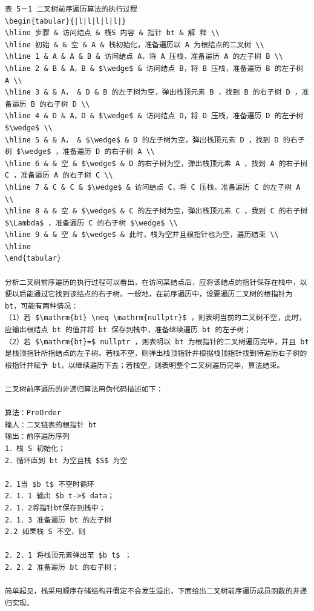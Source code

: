 \documentclass[10pt]{article}
\begin{document}
\begin{verbatim}
表 5－1 二叉树前序遍历算法的执行过程
\begin{tabular}{|l|l|l|l|l|}
\hline 步骤 & 访问结点 & 桟S 内容 & 指针 bt & 解 释 \\
\hline 初始 & & 空 & A & 栈初始化，准备遍历以 A 为根结点的二叉树 \\
\hline 1 & A & A & B & 访问结点 A，将 A 压栈，准备遍历 A 的左子树 B \\
\hline 2 & B & A，B & $\wedge$ & 访问结点 B，将 B 压栈，准备遍历 B 的左子树 A \\
\hline 3 & & A， & D & B 的左子树为空，弹出栈顶元素 B ，找到 B 的右子树 D ，准备遍历 B 的右子树 D \\
\hline 4 & D & A，D & $\wedge$ & 访问结点 D，将 D 压桟，准备遍历 D 的左子树 $\wedge$ \\
\hline 5 & & A， & $\wedge$ & D 的左子树为空，弹出栈顶元素 D ，找到 D 的右子树 $\wedge$ ，准备遍历 D 的右子树 A \\
\hline 6 & & 空 & $\wedge$ & D 的右子树为空，弹出栈顶元素 A ，找到 A 的右子树 C ，准备遍历 A 的右子树 C \\
\hline 7 & C & C & $\wedge$ & 访问结点 C，将 C 压栈，准备遍历 C 的左子树 A \\
\hline 8 & & 空 & $\wedge$ & C 的左子树为空，弹出栈顶元素 C ，我到 C 的右子树 $\Lambda$ ，准备遍历 C 的右子树 $\wedge$ \\
\hline 9 & & 空 & $\wedge$ & 此时，栈为空并且根指针也为空，遍历结束 \\
\hline
\end{tabular}

分析二叉树前序遍历的执行过程可以看出，在访问某结点后，应将该结点的指针保存在栈中，以便以后能通过它找到该结点的右子树。一般地，在前序遍历中，设要遍历二叉树的根指针为 bt，可能有两种情况：
（1）若 $\mathrm{bt} \neq \mathrm{nullptr}$ ，则表明当前的二叉树不空，此时，应输出根结点 bt 的值并将 bt 保存到栈中，准备继续遍历 bt 的左子树；
（2）若 $\mathrm{bt}=$ nullptr ，则表明以 bt 为根指针的二叉树遍历完毕，并且 bt 是栈顶指针所指结点的左子树。若栈不空，则弹出栈顶指针并根据栈顶指针找到待遍历右子树的根指针并赋予 bt，以继续遍历下去；若栈空，则表明整个二叉树遍历完毕，算法结束。

二叉树前序遍历的非递归算法用伪代码描述如下：

算法：PreOrder
输人：二叉链表的根指针 bt
输出：前序遍历序列
1．栈 S 初始化；
2．循环直到 bt 为空且栈 $S$ 为空

2．1当 $b t$ 不空时循环
2．1．1 输出 $b t->$ data；
2．1．2将指针bt保存到栈中；
2．1．3 准备遍历 bt 的左子树
2.2 如果栈 S 不空，则

2．2．1 将栈顶元素弹出至 $b t$ ；
2．2．2 准备遍历 bt 的右子树；

简单起见，栈采用顺序存储结构并假定不会发生溢出，下面给出二叉树前序遍历成员函数的非递归实现。
\end{verbatim}
\end{document}
